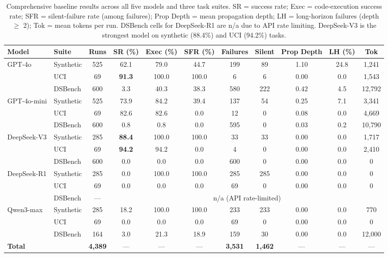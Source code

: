 \begin{table}[t]
\centering
\caption{Comprehensive baseline results across all five models and three task suites. SR = success rate; Exec = code-execution success rate; SFR = silent-failure rate (among failures); Prop Depth = mean propagation depth; LH = long-horizon failures (depth $\geq$ 2); Tok = mean tokens per run. DSBench cells for DeepSeek-R1 are n/a due to API rate limiting. DeepSeek-V3 is the strongest model on synthetic (88.4\%) and UCI (94.2\%) tasks.}
\label{tab:comprehensive}
\small
\begin{tabular}{@{}llccccccccc@{}}
\toprule
Model & Suite & Runs & SR (\%) & Exec (\%) & SFR (\%) & Failures & Silent & Prop Depth & LH (\%) & Tok \\
\midrule
\multirow{3}{*}{GPT-4o}
 & Synthetic & 525 & 62.1 & 79.0 & 44.7 & 199 & 89 & 1.10 & 24.8 & 1{,}241 \\
 & UCI & 69 & \textbf{91.3} & 100.0 & 100.0 & 6 & 6 & 0.00 & 0.0 & 1{,}543 \\
 & DSBench & 600 & 3.3 & 40.3 & 38.3 & 580 & 222 & 0.42 & 4.5 & 12{,}792 \\
\midrule
\multirow{3}{*}{GPT-4o-mini}
 & Synthetic & 525 & 73.9 & 84.2 & 39.4 & 137 & 54 & 0.25 & 7.1 & 3{,}341 \\
 & UCI & 69 & 82.6 & 82.6 & 0.0 & 12 & 0 & 0.08 & 0.0 & 4{,}669 \\
 & DSBench & 600 & 0.8 & 0.8 & 0.0 & 595 & 0 & 0.03 & 0.2 & 10{,}790 \\
\midrule
\multirow{3}{*}{DeepSeek-V3}
 & Synthetic & 285 & \textbf{88.4} & 100.0 & 100.0 & 33 & 33 & 0.00 & 0.0 & 1{,}717 \\
 & UCI & 69 & \textbf{94.2} & 94.2 & 0.0 & 4 & 0 & 0.00 & 0.0 & 2{,}410 \\
 & DSBench & 600 & 0.0 & 0.0 & 0.0 & 600 & 0 & 0.00 & 0.0 & 0 \\
\midrule
\multirow{3}{*}{DeepSeek-R1}
 & Synthetic & 285 & 0.0 & 100.0 & 100.0 & 285 & 285 & 0.00 & 0.0 & 0 \\
 & UCI & 69 & 0.0 & 0.0 & 0.0 & 69 & 0 & 0.00 & 0.0 & 0 \\
 & DSBench & --- & \multicolumn{8}{c}{n/a (API rate-limited)} \\
\midrule
\multirow{3}{*}{Qwen3-max}
 & Synthetic & 285 & 18.2 & 100.0 & 100.0 & 233 & 233 & 0.00 & 0.0 & 770 \\
 & UCI & 69 & 0.0 & 0.0 & 0.0 & 69 & 0 & 0.00 & 0.0 & 0 \\
 & DSBench & 164 & 3.0 & 21.3 & 18.9 & 159 & 30 & 0.00 & 0.0 & 12{,}000 \\
\midrule
\multicolumn{2}{l}{\textbf{Total}} & \textbf{4{,}389} & --- & --- & --- & \textbf{3{,}531} & \textbf{1{,}462} & --- & --- & --- \\
\bottomrule
\end{tabular}
\end{table}

